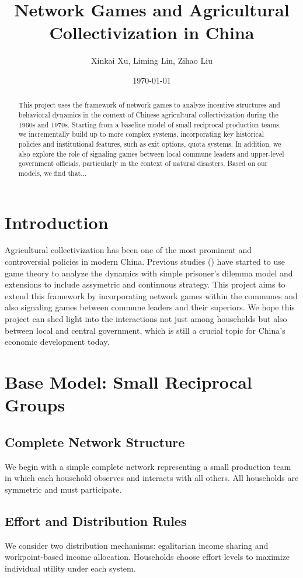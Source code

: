 \documentclass[12pt]{article}
\title{Network Games and Agricultural Collectivization in China}
\author{Xinkai Xu, Liming Lin, Zihao Liu}
\date{\today}
\begin{document}
\maketitle
\onehalfspacing

\begin{abstract}
This project uses the framework of network games to analyze incentive structures and behavioral dynamics in the context of Chinese agricultural collectivization during the 1960s and 1970s. Starting from a baseline model of small reciprocal production teams, we incrementally build up to more complex systems, incorporating key historical policies and institutional features, such as exit options, quota systems. In addition, we also explore the role of signaling games between local commune leaders and upper-level government officials, particularly in the context of natural disasters. Based on our models, we find that...
\end{abstract}

\section{Introduction}
Agricultural collectivization has been one of the most prominent and controversial policies in modern China. Previous studies (\cite{chinnDiligenceLazinessChinese1980, nitzanDiligenceLazinessChinese1987}) have started to use game theory to analyze the dynamics with simple prisoner's dilemma model and extensions to include assymetric and continuous strategy. This project aims to extend this framework by incorporating network games within the communes and also signaling games between commune leaders and their superiors. We hope this project can shed light into the interactions not just among households but also between local and central government, which is still a crucial topic for China's economic development today.
\section{Base Model: Small Reciprocal Groups}
\subsection{Complete Network Structure}
We begin with a simple complete network representing a small production team in which each household observes and interacts with all others. All households are symmetric and must participate.

\subsection{Effort and Distribution Rules}
We consider two distribution mechanisms: egalitarian income sharing and workpoint-based income allocation. Households choose effort levels to maximize individual utility under each system.
\end{document}
